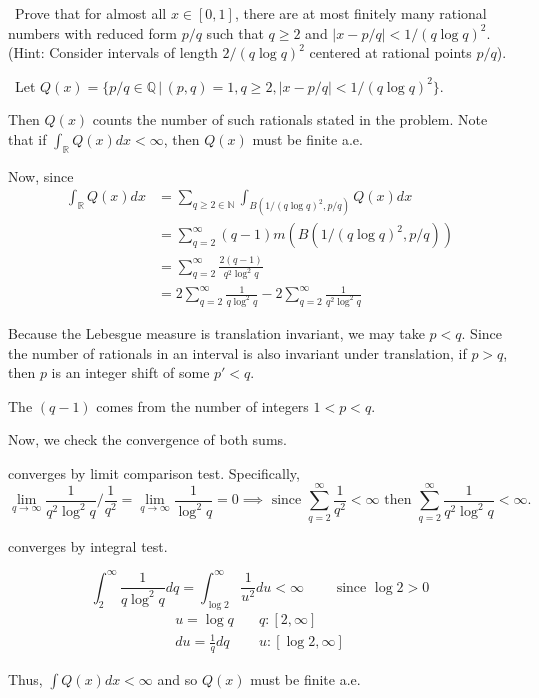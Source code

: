 \documentclass[12pt]{Qual}
\begin{document}
\begin{problem} $\,$
Prove that for almost all $x\in[0,1]$, there are at most finitely many rational numbers with reduced form $p/q$ such that $q\ge 2$ and $|x-p/q|<1/(q\log q)^2$. (Hint: Consider intervals of length $2/(q\log q)^2$ centered at rational points $p/q$).
\end{problem}


\begin{solution}$\,$
Let $Q(x)=\{p/q\in\mathbb{Q}\,|\,(p,q)=1,q\ge 2, |x-p/q|<1/(q\log q)^2\}$.

Then $Q(x)$ counts the number of such rationals stated in the problem.
Note that if $\int_\mathbb{R}Q(x)dx<\infty$, then $Q(x)$ must be finite a.e.

Now, since \begin{align*}
    \int_\mathbb{R}Q(x)dx&=\sum_{q\ge 2\in\mathbb{N}}\int_{B(1/(q\log q)^2,p/q)}Q(x)dx\\
    &=\sum_{q=2}^\infty(q-1)m(B(1/(q\log q)^2,p/q)) \tag{1}\\
    &=\sum_{q=2}^\infty\frac{2(q-1)}{q^2\log^2q}\\
    &=2\sum_{q=2}^\infty\frac{1}{q\log^2q}-2\sum_{q=2}^\infty\frac{1}{q^2\log^2q}
\end{align*}

 Because the Lebesgue measure is translation invariant, we may take $p<q$. Since the number of rationals in an interval is also invariant under translation, if $p>q$, then $p$ is an integer shift of some $p'<q$.

The $(q-1)$ comes from the number of integers $1<p<q$.

Now, we check the convergence of both sums.

 converges by limit comparison test. Specifically, $$\lim_{q\to\infty}\frac{1}{q^2\log^2q}/\frac{1}{q^2}=\lim_{q\to\infty}\frac{1}{\log^2q}=0\implies\text{ since }\sum_{q=2}^\infty\frac{1}{q^2}<\infty\text{ then }\sum_{q=2}^\infty\frac{1}{q^2\log^2q}<\infty.$$

 converges by integral test.

$$\int_2^\infty\frac{1}{q\log^2q}dq=\int_{\log2}^\infty\frac{1}{u^2}du<\infty\qquad\text{ since }\log2>0$$
\[
\begin{matrix}
    u=\log q & \quad  q:[2,\infty]\\
    du=\frac{1}{q}dq & \quad u:[\log2,\infty]
\end{matrix}
\]

Thus, $\int Q(x)dx<\infty$ and so $Q(x)$ must be finite a.e.
\end{solution}
\newpage
\end{document}
